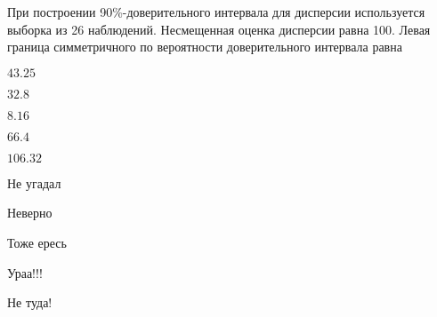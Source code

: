 
\begin{question}
При построении 90\%-доверительного интервала для дисперсии используется
выборка из 26 наблюдений. Несмещенная оценка дисперсии равна 100. Левая
граница симметричного по вероятности доверительного интервала равна
\begin{answerlist}
  \item \(43.25\)
  \item \(32.8\)
  \item \(8.16\)
  \item \(66.4\)
  \item \(106.32\)
\end{answerlist}
\end{question}

\begin{solution}
\begin{answerlist}
  \item Не угадал
  \item Неверно
  \item Тоже ересь
  \item Ураа!!!
  \item Не туда!
\end{answerlist}
\end{solution}

